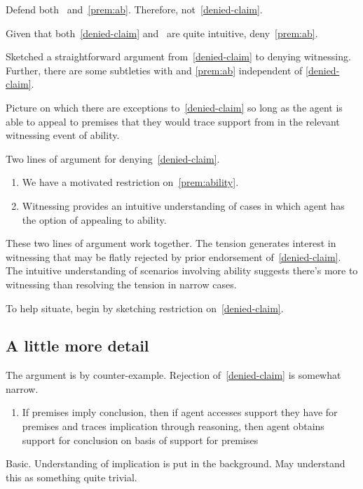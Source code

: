 \begin{note}
  Defend both~\nI{} and~\ref{prem:ab}.
  Therefore, not~\ref{denied-claim}.

  Given that both~\ref{denied-claim} and~\nI{} are quite intuitive, deny~\ref{prem:ab}.

  Sketched a straightforward argument from~\ref{denied-claim} to denying witnessing.
  Further, there are some subtleties with \nI{} and \ref{prem:ab} independent of \ref{denied-claim}.

  Picture on which there are exceptions to~\ref{denied-claim} so long as the agent is able to appeal to premises that they would trace support from in the relevant witnessing event of ability.

  Two lines of argument for denying~\ref{denied-claim}.
  \begin{enumerate}
  \item We have a motivated restriction on~\ref{prem:ability}.
  \item Witnessing provides an intuitive understanding of cases in which agent has the option of appealing to ability.
  \end{enumerate}
  These two lines of argument work together.
  The tension generates interest in witnessing that may be flatly rejected by prior endorsement of~\ref{denied-claim}.
  The intuitive understanding of scenarios involving ability suggests there's more to witnessing than resolving the tension in narrow cases.

  To help situate, begin by sketching restriction on~\ref{denied-claim}.
\end{note}

\subsection{A little more detail}
\label{sec:little-more-detail}

The argument is by counter-example.
Rejection of~\ref{denied-claim} is somewhat narrow.

\begin{enumerate}[]
\item\label{access} If premises imply conclusion, then if agent accesses support they have for premises and traces implication through reasoning, then agent obtains support for conclusion on basis of support for premises
\end{enumerate}

Basic.
Understanding of implication is put in the background.
May understand this as something quite trivial.

